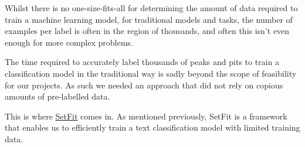 \documentclass[
  letterpaper,
  DIV=11,
  numbers=noendperiod]{scrreprt}
\begin{document}
Whilst there is no one-size-fits-all for determining the amount of data
required to train a machine learning model, for traditional models and
tasks, the number of examples per label is often in the region of
thousands, and often this isn't even enough for more complex problems.

The time required to accurately label thousands of peaks and pits to
train a classification model in the traditional way is sadly beyond the
scope of feasibility for our projects. As such we needed an approach
that did not rely on copious amounts of pre-labelled data.

This is where
\href{https://huggingface.co/docs/setfit/conceptual_guides/setfit}{SetFit}
comes in. As mentioned previously, SetFit is a framework that enables us
to efficiently train a text classification model with limited training
data.
\end{document}
